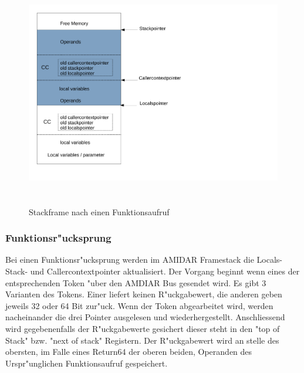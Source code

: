 \begin{figure}
	\centering
	\includegraphics[height = 10cm]{PS_RS_graphics/Stackframe after Invoke.pdf}
	\caption{Stackframe nach einen Funktionsaufruf}
\end{figure}


\subsubsection{Funktionsr"ucksprung}

Bei einen Funktionsr"ucksprung werden im AMIDAR Framestack die Locals- Stack- und Callercontextpointer aktualisiert. Der Vorgang beginnt wenn eines der entsprechenden Token "uber den AMDIAR Bus gesendet wird. Es gibt 3 Varianten des Tokens. Einer liefert keinen R"uckgabewert, die anderen geben jeweils 32 oder 64 Bit zur"uck. Wenn der Token abgearbeitet wird, werden nacheinander die drei Pointer ausgelesen und wiederhergestellt. Anschlie{ss}end wird gegebenenfalls der R"uckgabewerte gesichert dieser steht in den "top of Stack" bzw. "next of stack" Registern. Der R"uckgabewert wird an stelle des obersten, im Falle eines Return64 der oberen beiden, Operanden des Urspr"unglichen Funktionsaufruf gespeichert. 

